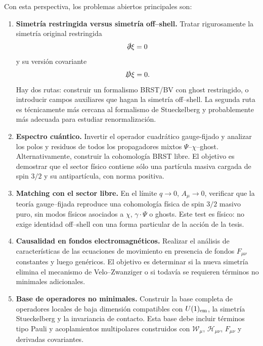 \documentclass[11pt,a4paper]{article}
\numberwithin{equation}{section}
\newcommand{\Wcal}{\mathcal W}
\newcommand{\Hcal}{\mathcal H}
\begin{document}
Con esta perspectiva, los problemas abiertos principales son:
\begin{enumerate}[label=(\arabic*)]

\item \textbf{Simetría restringida versus simetría off--shell.}
Tratar rigurosamente la simetría original restringida
\begin{equation}
  \slashed{\partial}\xi=0
\end{equation}
y su versión covariante
\begin{equation}
  \slashed{D}\xi=0.
\end{equation}
Hay dos rutas: construir un formalismo BRST/BV con ghost restringido, o introducir
campos auxiliares que hagan la simetría off--shell. La segunda ruta es técnicamente más
cercana al formalismo de Stueckelberg y probablemente más adecuada para estudiar
renormalización.

\item \textbf{Espectro cuántico.}
Invertir el operador cuadrático gauge-fijado y analizar los polos y residuos de todos los
propagadores mixtos $\Psi$--$\chi$--ghost. Alternativamente, construir la cohomología
BRST libre. El objetivo es demostrar que el sector físico contiene sólo una partícula
masiva cargada de spin $3/2$ y su antipartícula, con norma positiva.

\item \textbf{Matching con el sector libre.}
En el límite $q\to0$, $A_\mu\to0$, verificar que la teoría gauge--fijada reproduce una
cohomología física de spin $3/2$ masivo puro, sin modos físicos asociados a $\chi$,
$\gamma\cdot\Psi$ o ghosts. Este test es físico: no exige identidad off--shell con una
forma particular de la acción de la tesis.

\item \textbf{Causalidad en fondos electromagnéticos.}
Realizar el análisis de características de las ecuaciones de movimiento en presencia de
fondos $F_{\mu\nu}$ constantes y luego genéricos. El objetivo es determinar si la nueva
simetría elimina el mecanismo de Velo--Zwanziger o si todavía se requieren términos
no minimales adicionales.

\item \textbf{Base de operadores no minimales.}
Construir la base completa de operadores locales de baja dimensión compatibles con
$U(1)_{\rm em}$, la simetría Stueckelberg y la invariancia de contacto. Esta base debe
incluir términos tipo Pauli y acoplamientos multipolares construidos con
$\Wcal_\mu$, $\Hcal_{\mu\nu}$, $F_{\mu\nu}$ y derivadas covariantes.


\end{enumerate}
\end{document}

